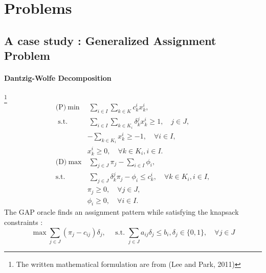 \documentclass[12pt]{article}
\begin{document}
	\section{Problems}
	\subsection{A case study : Generalized Assignment Problem }
	\paragraph{Dantzig-Wolfe Decomposition}\footnote{\scriptsize{The written mathematical formulation are from (Lee and Park, 2011)}}
	\begin{align*}
\text{(P)}~ \min& ~ \sum _ { i \in I } \sum _ { k \in K } c _ { k } ^ { i } x _ { k } ^ { i },\\
	\text { s.t. }&  ~ \sum _ { i \in I } \sum _ { k \in K _ { i } } \delta _ { k } ^ { j } x _ { k } ^ { i } \geq 1 , \quad j \in J, \\
	&- \sum _ { k \in K _ { i } } x _ { k } ^ { i } \geq - 1 , \quad \forall i \in I ,\\
	&x _ { k } ^ { i } \geq 0 , \quad \forall k \in K _ { i } , i \in I .	\\[5mm]
 	\text{(D)}~   \max& ~ \sum _ { j \in J } \pi _ { j } - \sum _ { i \in I } \phi _ { i }, \\
	\text{s.t. } & ~ \sum _ { j \in J } \delta _ { k } ^ { j } \pi _ { j } - \phi _ { i } \leq c _ { k } ^ { i } , \quad \forall k \in K _ { i } , i \in I, \\
	&\pi _ { j } \geq 0 , \quad \forall j \in J ,\\
	&\phi _ { i } \geq 0 , \quad \forall i \in I. 
	\end{align*}
	The GAP oracle finds an assignment pattern while satisfying the knapsack constraints :
	 \begin{equation*}
	 \max \sum _ { j \in J } \left( \pi _ { j } - c _ { i j } \right) \delta _ { j } , \quad \text { s.t. } \sum _ { j \in J } a _ { i j } \delta _ { j } \leq b _ { i } , \delta _ { j } \in \{ 0,1 \} , \quad \forall j \in J
	 \end{equation*}
\end{document}
